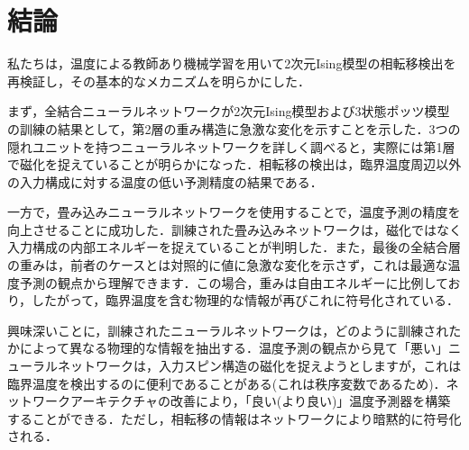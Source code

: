 \documentclass[a4paper,11pt]{jsarticle}
\begin{document}
\section{結論}
私たちは，温度による教師あり機械学習を用いて2次元Ising模型の相転移検出を再検証し，その基本的なメカニズムを明らかにした．\par
まず，全結合ニューラルネットワークが2次元Ising模型および3状態ポッツ模型の訓練の結果として，第2層の重み構造に急激な変化を示すことを示した．3つの隠れユニットを持つニューラルネットワークを詳しく調べると，実際には第1層で磁化を捉えていることが明らかになった．相転移の検出は，臨界温度周辺以外の入力構成に対する温度の低い予測精度の結果である．\par
一方で，畳み込みニューラルネットワークを使用することで，温度予測の精度を向上させることに成功した．訓練された畳み込みネットワークは，磁化ではなく入力構成の内部エネルギーを捉えていることが判明した．また，最後の全結合層の重みは，前者のケースとは対照的に値に急激な変化を示さず，これは最適な温度予測の観点から理解できます．この場合，重みは自由エネルギーに比例しており，したがって，臨界温度を含む物理的な情報が再びこれに符号化されている．\par
興味深いことに，訓練されたニューラルネットワークは，どのように訓練されたかによって異なる物理的な情報を抽出する．温度予測の観点から見て「悪い」ニューラルネットワークは，入力スピン構造の磁化を捉えようとしますが，これは臨界温度を検出するのに便利であることがある(これは秩序変数であるため)．ネットワークアーキテクチャの改善により，「良い(より良い)」温度予測器を構築することができる．ただし，相転移の情報はネットワークにより暗黙的に符号化される．
\end{document}
